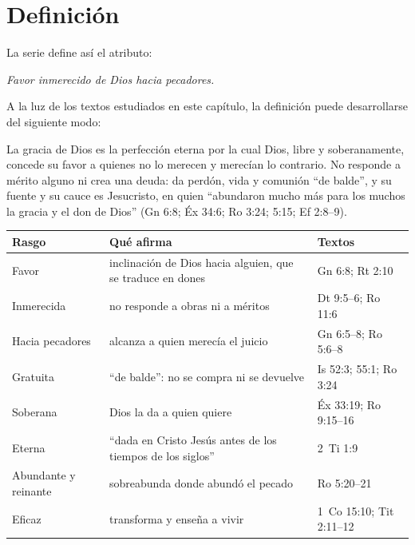 
\section{Definición}

La serie define así el atributo:

\begin{tcolorbox}[colback=papiro,colframe=dorado,boxrule=1.2pt,arc=3pt]
\centering\large\itshape Favor inmerecido de Dios hacia pecadores.
\end{tcolorbox}

A la luz de los textos estudiados en este capítulo, la definición puede desarrollarse del siguiente modo:

\begin{tcolorbox}[colback=papiro,colframe=azul,boxrule=1pt,arc=3pt,fonttitle=\bfseries,title=Definición]
La gracia de Dios es la perfección eterna por la cual Dios, libre y soberanamente, concede su favor a quienes no lo merecen y merecían lo contrario. No responde a mérito alguno ni crea una deuda: da perdón, vida y comunión ``de balde'', y su fuente y su cauce es Jesucristo, en quien ``abundaron mucho más para los muchos la gracia y el don de Dios'' (Gn 6:8; Éx 34:6; Ro 3:24; 5:15; Ef 2:8--9).
\end{tcolorbox}

\begin{center}\small\renewcommand{\arraystretch}{1.2}
\begin{tabular}{@{}L{3.6cm}L{6.4cm}L{4.4cm}@{}}
\toprule
\textbf{Rasgo} & \textbf{Qué afirma} & \textbf{Textos} \\ \midrule
Favor & inclinación de Dios hacia alguien, que se traduce en dones & Gn 6:8; Rt 2:10 \\
Inmerecida & no responde a obras ni a méritos & Dt 9:5--6; Ro 11:6 \\
Hacia pecadores & alcanza a quien merecía el juicio & Gn 6:5--8; Ro 5:6--8 \\
Gratuita & ``de balde'': no se compra ni se devuelve & Is 52:3; 55:1; Ro 3:24 \\
Soberana & Dios la da a quien quiere & Éx 33:19; Ro 9:15--16 \\
Eterna & ``dada en Cristo Jesús antes de los tiempos de los siglos'' & 2~Ti 1:9 \\
Abundante y reinante & sobreabunda donde abundó el pecado & Ro 5:20--21 \\
Eficaz & transforma y enseña a vivir & 1~Co 15:10; Tit 2:11--12 \\
\bottomrule
\end{tabular}\end{center}

